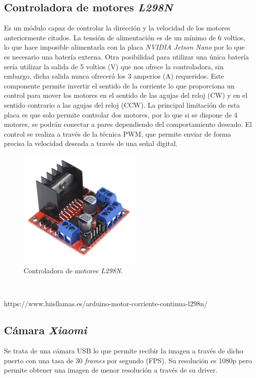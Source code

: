 \subsection{Controladora de motores \textit{L298N}}
Es un módulo capaz de controlar la dirección y la velocidad de los motores anteriormente citados. La tensión de alimentación es de un mínimo de 6 voltios, lo que hace imposible alimentarla con la placa \textit{NVIDIA Jetson Nano} por lo que es necesario una batería externa. Otra posibilidad para utilizar una única batería sería utilizar la salida de 5 voltios (V) que nos ofrece la controladora, sin embargo, dicha salida nunca ofrecerá los 3 amperios (A) requeridos. Este componente permite invertir el sentido de la corriente lo que proporciona un control para mover los motores en el sentido de las agujas del reloj (CW) y en el sentido contrario a las agujas del reloj (CCW). La principal limitación de esta placa es que solo permite controlar dos motores, por lo que si se dispone de 4 motores, se podrán conectar a pares dependiendo del comportamiento deseado. El control se realiza a través de la técnica PWM, que permite enviar de forma precisa la velocidad deseada a través de una señal digital.\\

\begin{figure} [h!]
	\begin{center}
		\includegraphics[width=6cm]{figs/l298n}
	\end{center}
	\caption{Controladora de motores \textit{L298N}.}
	\label{fig:l298n}
\end{figure}\

https://www.luisllamas.es/arduino-motor-corriente-continua-l298n/

\subsection{Cámara \textit{Xiaomi}}
Se trata de una cámara USB lo que permite recibir la imagen a través de dicho puerto con una tasa de 30 \textit{frames} por segundo (FPS). Su resolución es 1080p pero permite obtener una imagen de menor resolución a través de su driver.\\

